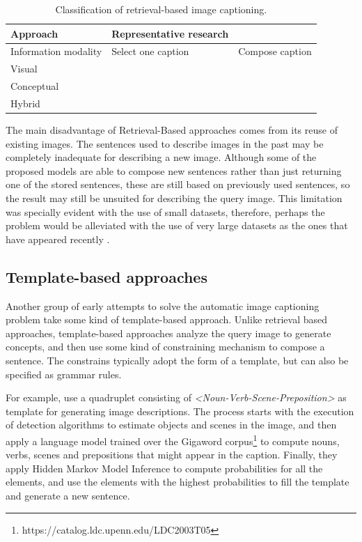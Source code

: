 \begin{table}[ht]
\centering
\caption{Classification of retrieval-based image captioning.}
\begin{tabular}[t]{p{}p{}p{}}
    \toprule
    Approach & Representative research\\
    \midrule
    Information modality & Select one caption & Compose caption \\
    Visual & \citet{Farhadi2010, Mason2015} & \cite{Gupta2012} \\
    Conceptual &  \cite{Ordonez2011} & \citet{Kuznetsova2012, Kuznetsova2014} \\
    Hybrid &  \citet{Hodosh2013b} & \\
    \bottomrule
\end{tabular}
\label{tab:retrieval_classification}
\end{table}

The main disadvantage of Retrieval-Based approaches comes from its reuse of existing images. The sentences used to describe images in the past may be completely inadequate for describing a new image. Although some of the proposed models are able to compose new sentences rather than just returning one of the stored sentences, these are still based on previously used sentences, so the result may still be unsuited for describing the query image. This limitation was specially evident with the use of small datasets, therefore, perhaps the problem would be alleviated with the use of very large datasets as the ones that have appeared recently \citet{Lin2014, Sharma2018}.

\subsection{Template-based approaches}\label{subsec:template-based_methods}

Another group of early attempts to solve the automatic image captioning problem take some kind of template-based approach. Unlike retrieval based approaches, template-based approaches analyze the query image to generate concepts, and then use some kind of constraining mechanism to compose a sentence. The constrains typically adopt the form of a template, but can also be specified as grammar rules.

For example, \citet{Yang2011} use a quadruplet consisting of \textit{<Noun-Verb-Scene-Preposition>} as template for generating image descriptions. The process starts with the execution of detection algorithms to estimate objects and scenes in the image, and then apply a language model trained over the Gigaword corpus\footnote{https://catalog.ldc.upenn.edu/LDC2003T05} to compute nouns, verbs, scenes and prepositions that might appear in the caption. Finally, they apply Hidden Markov Model Inference to compute probabilities for all the elements, and use the elements with the highest probabilities to fill the template and generate a new sentence.

